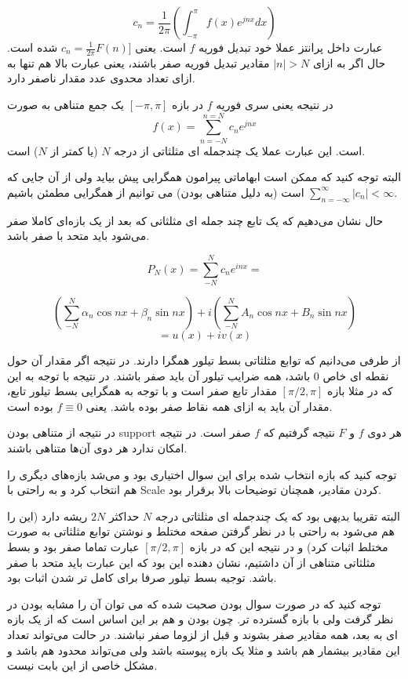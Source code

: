 \documentclass[12pt]{article}
\begin{document}
$$c_n = \frac{1}{2\pi} (\int_{-\pi}^{\pi} f(x) e^{j n x} dx)$$
عبارت داخل پرانتز عملا خود تبدیل فوریه $f$ است. یعنی
$c_n = \frac{1}{2\pi} F(n)]$
شده است. حال اگر به ازای
$|n|>N$
مقادیر تبدیل فوریه صفر باشند، یعنی عبارت بالا هم تنها به ازای تعداد محدوی عدد مقدار ناصفر دارد.

در نتیجه یعنی سری فوریه $f$ در بازه 
$[-\pi , \pi]$
یک جمع متناهی به صورت
$$f(x)= \sum_{n=-N}^{n=N} c_n e^{j n x}$$
است. این عبارت عملا یک چندجمله ای مثلثاتی از درجه $N$ (یا کمتر از $N$) است.

البته توجه کنید که ممکن است ابهاماتی پیرامون همگرایی پیش بیاید ولی از آن جایی که 
$\sum_{n=-\infty}^{\infty} |c_n| <\infty$
است (به دلیل متناهی بودن) می توانیم از همگرایی مطمئن باشیم.

حال نشان می‌دهیم که یک تابع چند جمله ای مثلثاتی که بعد از یک بازه‌ای کاملا صفر می‌شود باید متحد با صفر باشد.


$$
P_{N}(x)=\sum_{-N}^{N} c_{n} e^{i n x}=
$$


$$
\left(\sum_{-N}^{N} \alpha_{n} \cos n x+\beta_{n} \sin n x\right)+i\left(\sum_{-N}^{N} A_{n} \cos n x+B_{n} \sin n x\right)
$$
$$=u(x) + i v(x)$$

از طرفی می‌دانیم که توابع مثلثاتی بسط تیلور همگرا دارند. در نتیجه اگر مقدار آن حول نقطه ای خاص $0$ باشد، همه ضرایب تیلور آن باید صفر باشند. در نتیجه با توجه به این که در مثلا بازه
 $[\pi/2 , \pi]$
 مقدار تابع صفر است و با توجه به همگرایی بسط تیلور تابع، مقدار آن باید به ازای همه نقاط صفر بوده باشد. یعنی $f\equiv0$ بوده است.
 
 در نتیجه از متناهی بودن support هر دوی $f$ و $F$ نتیجه گرفتیم که $f$ صفر است. در نتیجه امکان ندارد هر دوی آن‌ها متناهی باشند.
 
 توجه کنید که بازه انتخاب شده برای این سوال اختیاری بود و می‌شد بازه‌های دیگری را هم انتخاب کرد و به راحتی با Scale کردن مقادیر، همچنان توضیحات بالا برقرار بود.
 
 
 البته تقریبا بدیهی بود که یک چندجمله ای مثلثاتی درجه $N$ حداکثر $2N$ ریشه دارد (این را هم می‌شود به راحتی با در نظر گرفتن صفحه مختلط و نوشتن توابع مثلثاتی به صورت مختلط اثبات کرد) و در نتیجه این که در بازه
 $[\pi/2 , \pi]$
 عبارت تماما صفر بود و بسط مثلثاتی متناهی از آن داشتیم،‌ نشان دهنده این بود که این عبارت باید متحد با صفر باشد. توجیه بسط تیلور صرفا برای کامل تر شدن اثبات بود.
 
 
 توجه کنید که در صورت سوال  بودن صحبت شده که می توان آن را مشابه  بودن در نظر گرفت ولی با بازه گسترده تر. چون  بودن و  هم بر این اساس است که از یک بازه ای به بعد، همه مقادیر صفر بشوند و قبل از لزوما صفر نباشند. در حالت  می‌تواند تعداد این مقادیر بیشمار هم باشد و مثلا یک بازه پیوسته باشد ولی می‌تواند محدود هم باشد و مشکل خاصی از این بابت نیست.
 
\end{document}
